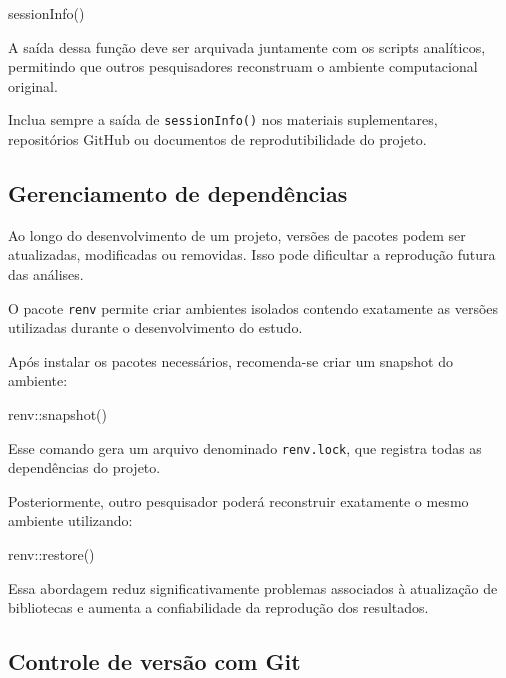 \documentclass{ueap-sdm}
\begin{document}
\begin{rcode}
	sessionInfo()
\end{rcode}

A saída dessa função deve ser arquivada juntamente com os scripts analíticos,
permitindo que outros pesquisadores reconstruam o ambiente computacional
original.

\begin{sdmpracticebox}
	Inclua sempre a saída de \texttt{sessionInfo()} nos materiais suplementares,
	repositórios GitHub ou documentos de reprodutibilidade do projeto.
\end{sdmpracticebox}

\subsection{Gerenciamento de dependências}

Ao longo do desenvolvimento de um projeto, versões de pacotes podem ser
atualizadas, modificadas ou removidas. Isso pode dificultar a reprodução futura
das análises.

O pacote \texttt{renv} permite criar ambientes isolados contendo exatamente as
versões utilizadas durante o desenvolvimento do estudo.

Após instalar os pacotes necessários, recomenda-se criar um snapshot do
ambiente:

\begin{rcode}
	renv::snapshot()
\end{rcode}

Esse comando gera um arquivo denominado \texttt{renv.lock}, que registra todas
as dependências do projeto.

Posteriormente, outro pesquisador poderá reconstruir exatamente o mesmo
ambiente utilizando:

\begin{rcode}
	renv::restore()
\end{rcode}

Essa abordagem reduz significativamente problemas associados à atualização de
bibliotecas e aumenta a confiabilidade da reprodução dos resultados.

\subsection{Controle de versão com Git}
\end{document}
